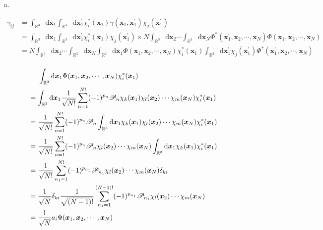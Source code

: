 \documentclass[a4paper]{book}
\newcommand*{\dif}{\mathop{}\!\mathrm{d}}
\begin{document}
	\begin{solution}
	
	\begin{itemize}
	
	\item[a.]
	
	\begin{align*}
		\gamma_{ij} &= \int_{ \mathbb{R}^3 } \dif \boldsymbol{x}_1 \int_{ \mathbb{R}^3 } \dif \boldsymbol{x}^\prime_1 \chi^*_i( \boldsymbol{x}_1 ) \gamma( \boldsymbol{x}_1 , \boldsymbol{x}^\prime_1 ) \chi_j( \boldsymbol{x}^\prime_1 ) \\
		&= \int_{ \mathbb{R}^3 } \dif \boldsymbol{x}_1 \int_{ \mathbb{R}^3 } \dif \boldsymbol{x}^\prime_1 \chi^*_i( \boldsymbol{x}_1 ) \chi_j( \boldsymbol{x}^\prime_1 ) \times N \int_{ \mathbb{R}^3 } \dif \boldsymbol{x}_2 \cdots \int_{ \mathbb{R}^3 } \dif \boldsymbol{x}_N \Phi^*( \boldsymbol{x}^\prime_1, \boldsymbol{x}_2, \cdots , \boldsymbol{x}_N ) \Phi( \boldsymbol{x}_1, \boldsymbol{x}_2, \cdots , \boldsymbol{x}_N ) \\
		&= N \int_{ \mathbb{R}^3 } \dif \boldsymbol{x}_2 \cdots \int_{ \mathbb{R}^3 } \dif \boldsymbol{x}_N \int_{ \mathbb{R}^3 } \dif \boldsymbol{x}_1 \Phi( \boldsymbol{x}_1, \boldsymbol{x}_2, \cdots , \boldsymbol{x}_N ) \chi^*_i( \boldsymbol{x}_1 ) \int_{ \mathbb{R}^3 } \dif \boldsymbol{x}^\prime_1 \chi_j( \boldsymbol{x}^\prime_1 ) \Phi^*( \boldsymbol{x}^\prime_1, \boldsymbol{x}_2, \cdots , \boldsymbol{x}_N ) \\
	\end{align*}
	
	\begin{align*}
		&\hspace{1.4em} \int_{ \mathbb{R}^3 } \dif \boldsymbol{x}_1 \Phi( \boldsymbol{x}_1, \boldsymbol{x}_2, \cdots , \boldsymbol{x}_N ) \chi^*_i( \boldsymbol{x}_1 ) \\
		&= \int_{ \mathbb{R}^3 } \dif \boldsymbol{x}_1 \frac{1}{ \sqrt{N!} } \sum_{n=1}^{N!} (-1)^{p_n} \mathscr{P}_n \chi_k( \boldsymbol{x}_1 ) \chi_l( \boldsymbol{x}_2 ) \cdots \chi_m( \boldsymbol{x}_N ) \chi^*_i( \boldsymbol{x}_1 ) \\
		&= \frac{1}{ \sqrt{N!} } \sum_{n=1}^{N!} (-1)^{p_n} \mathscr{P}_n \int_{ \mathbb{R}^3 } \dif \boldsymbol{x}_1  \chi_k( \boldsymbol{x}_1 ) \chi_l( \boldsymbol{x}_2 ) \cdots \chi_m( \boldsymbol{x}_N ) \chi^*_i( \boldsymbol{x}_1 ) \\
		&= \frac{1}{ \sqrt{N!} } \sum_{n=1}^{N!} (-1)^{p_n} \mathscr{P}_n \chi_l( \boldsymbol{x}_2 ) \cdots \chi_m( \boldsymbol{x}_N ) \int_{ \mathbb{R}^3 } \dif \boldsymbol{x}_1 \chi_k( \boldsymbol{x}_1 ) \chi^*_i( \boldsymbol{x}_1 ) \\
		&= \frac{1}{ \sqrt{N!} } \sum_{n_1=1}^{N!} (-1)^{p_{n_1}} \mathscr{P}_{n_1} \chi_l( \boldsymbol{x}_2 ) \cdots \chi_m( \boldsymbol{x}_N ) \delta_{ki}  \\
		&= \frac{1}{ \sqrt{N} } \delta_{ki} \frac{1}{ \sqrt{(N-1)!} } \sum_{n_1=1}^{(N-1)!} (-1)^{p_{n_1}} \mathscr{P}_{n_1} \chi_l( \boldsymbol{x}_2 ) \cdots \chi_m( \boldsymbol{x}_N ) \\
		&= \frac{1}{ \sqrt{N} } a_i \Phi( \boldsymbol{x}_1, \boldsymbol{x}_2, \cdots , \boldsymbol{x}_N )
	\end{align*}
	

\end{itemize}
\end{solution}
\end{document}
